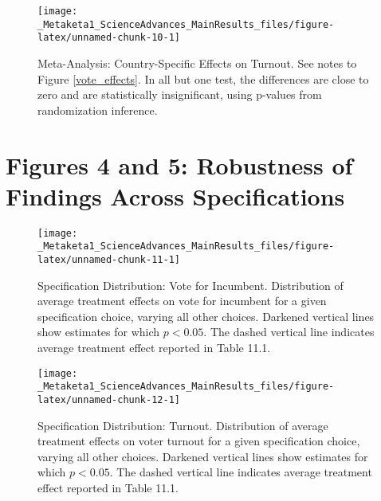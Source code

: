 \documentclass[]{article}
\begin{document}
\begin{figure}

{\centering \texttt{[image: \_Metaketa1\_ScienceAdvances\_MainResults\_files/figure-latex/unnamed-chunk-10-1]} 

}

\caption{Meta-Analysis: Country-Specific Effects on Turnout. See notes to Figure \ref{vote_effects}. In all but one test, the differences are close to zero and are statistically insignificant, using p-values from randomization inference.}\label{fig:unnamed-chunk-10}
\end{figure}

\clearpage

\section{Figures 4 and 5: Robustness of Findings Across
Specifications}\label{figures-4-and-5-robustness-of-findings-across-specifications}

\begin{figure}

{\centering \texttt{[image: \_Metaketa1\_ScienceAdvances\_MainResults\_files/figure-latex/unnamed-chunk-11-1]} 

}

\caption{Specification Distribution: Vote for Incumbent. Distribution of average treatment effects on vote for incumbent for a given specification choice, varying all other choices. Darkened vertical lines show estimates for which $p<0.05$. The dashed vertical line indicates average treatment effect reported in Table 11.1.}\label{fig:unnamed-chunk-11}
\end{figure}

\begin{figure}

{\centering \texttt{[image: \_Metaketa1\_ScienceAdvances\_MainResults\_files/figure-latex/unnamed-chunk-12-1]} 

}

\caption{Specification Distribution: Turnout. Distribution of average treatment effects on voter turnout for a given specification choice, varying all other choices. Darkened vertical lines show estimates for which $p<0.05$. The dashed vertical line indicates average treatment effect reported in Table 11.1.}\label{fig:unnamed-chunk-12}
\end{figure}
\end{document}
